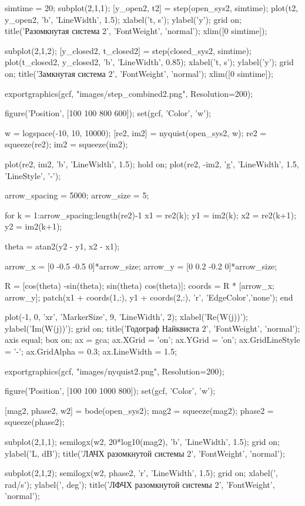 \begin{matlabcode}
simtime = 20;
subplot(2,1,1);
[y_open2, t2] = step(open_sys2, simtime);
plot(t2, y_open2, 'b', 'LineWidth', 1.5);
xlabel('t, s');
ylabel('y');
grid on;
title('Разомкнутая система 2', 'FontWeight', 'normal');
xlim([0 simtime]);

subplot(2,1,2);
[y_closed2, t_closed2] = step(closed_sys2, simtime);
plot(t_closed2, y_closed2, 'b', 'LineWidth', 0.85);
xlabel('t, s');
ylabel('y');
grid on;
title('Замкнутая система 2', 'FontWeight', 'normal');
xlim([0 simtime]);

exportgraphics(gcf, "images/step_combined2.png", Resolution=200);

figure('Position', [100 100 800 600]);
set(gcf, 'Color', 'w');

w = logspace(-10, 10, 10000);
[re2, im2] = nyquist(open_sys2, w);
re2 = squeeze(re2);
im2 = squeeze(im2);

plot(re2, im2, 'b', 'LineWidth', 1.5);
hold on;
plot(re2, -im2, 'g', 'LineWidth', 1.5, 'LineStyle', '-');

arrow_spacing = 5000;
arrow_size = 5;

for k = 1:arrow_spacing:length(re2)-1
    x1 = re2(k);
    y1 = im2(k);
    x2 = re2(k+1);
    y2 = im2(k+1);

    theta = atan2(y2 - y1, x2 - x1);

    arrow_x = [0 -0.5 -0.5 0]*arrow_size;
    arrow_y = [0 0.2 -0.2 0]*arrow_size;

    R = [cos(theta) -sin(theta); sin(theta) cos(theta)];
    coords = R * [arrow_x; arrow_y];
    patch(x1 + coords(1,:), y1 + coords(2,:), 'r', 'EdgeColor','none');
end

plot(-1, 0, 'xr', 'MarkerSize', 9, 'LineWidth', 2);
xlabel('Re(W(j\omega))');
ylabel('Im(W(j\omega))');
grid on;
title('Годограф Найквиста 2', 'FontWeight', 'normal');
axis equal;
box on;
ax = gca;
ax.XGrid = 'on';
ax.YGrid = 'on';
ax.GridLineStyle = '-';
ax.GridAlpha = 0.3;
ax.LineWidth = 1.5;

exportgraphics(gcf, "images/nyquist2.png", Resolution=200);

figure('Position', [100 100 1000 800]);
set(gcf, 'Color', 'w');

[mag2, phase2, w2] = bode(open_sys2);
mag2 = squeeze(mag2);
phase2 = squeeze(phase2);

subplot(2,1,1);
semilogx(w2, 20*log10(mag2), 'b', 'LineWidth', 1.5);
grid on;
ylabel('L, dB');
title('ЛАЧХ разомкнутой системы 2', 'FontWeight', 'normal');

subplot(2,1,2);
semilogx(w2, phase2, 'r', 'LineWidth', 1.5);
grid on;
xlabel('\omega, rad/s');
ylabel('\phi, deg');
title('ЛФЧХ разомкнутой системы 2', 'FontWeight', 'normal');


\end{matlabcode}

